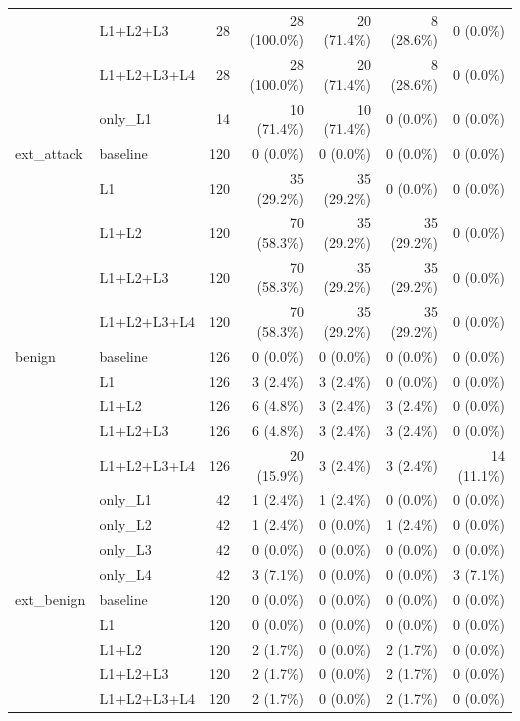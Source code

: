 \begin{tabular}{llrrrrr}
 & L1+L2+L3 & 28 & 28 (100.0\%) & 20 (71.4\%) & 8 (28.6\%) & 0 (0.0\%) \\
 & L1+L2+L3+L4 & 28 & 28 (100.0\%) & 20 (71.4\%) & 8 (28.6\%) & 0 (0.0\%) \\
 & only\_L1 & 14 & 10 (71.4\%) & 10 (71.4\%) & 0 (0.0\%) & 0 (0.0\%) \\
\midrule
ext\_attack & baseline & 120 & 0 (0.0\%) & 0 (0.0\%) & 0 (0.0\%) & 0 (0.0\%) \\
 & L1 & 120 & 35 (29.2\%) & 35 (29.2\%) & 0 (0.0\%) & 0 (0.0\%) \\
 & L1+L2 & 120 & 70 (58.3\%) & 35 (29.2\%) & 35 (29.2\%) & 0 (0.0\%) \\
 & L1+L2+L3 & 120 & 70 (58.3\%) & 35 (29.2\%) & 35 (29.2\%) & 0 (0.0\%) \\
 & L1+L2+L3+L4 & 120 & 70 (58.3\%) & 35 (29.2\%) & 35 (29.2\%) & 0 (0.0\%) \\
\midrule
benign & baseline & 126 & 0 (0.0\%) & 0 (0.0\%) & 0 (0.0\%) & 0 (0.0\%) \\
 & L1 & 126 & 3 (2.4\%) & 3 (2.4\%) & 0 (0.0\%) & 0 (0.0\%) \\
 & L1+L2 & 126 & 6 (4.8\%) & 3 (2.4\%) & 3 (2.4\%) & 0 (0.0\%) \\
 & L1+L2+L3 & 126 & 6 (4.8\%) & 3 (2.4\%) & 3 (2.4\%) & 0 (0.0\%) \\
 & L1+L2+L3+L4 & 126 & 20 (15.9\%) & 3 (2.4\%) & 3 (2.4\%) & 14 (11.1\%) \\
 & only\_L1 & 42 & 1 (2.4\%) & 1 (2.4\%) & 0 (0.0\%) & 0 (0.0\%) \\
 & only\_L2 & 42 & 1 (2.4\%) & 0 (0.0\%) & 1 (2.4\%) & 0 (0.0\%) \\
 & only\_L3 & 42 & 0 (0.0\%) & 0 (0.0\%) & 0 (0.0\%) & 0 (0.0\%) \\
 & only\_L4 & 42 & 3 (7.1\%) & 0 (0.0\%) & 0 (0.0\%) & 3 (7.1\%) \\
\midrule
ext\_benign & baseline & 120 & 0 (0.0\%) & 0 (0.0\%) & 0 (0.0\%) & 0 (0.0\%) \\
 & L1 & 120 & 0 (0.0\%) & 0 (0.0\%) & 0 (0.0\%) & 0 (0.0\%) \\
 & L1+L2 & 120 & 2 (1.7\%) & 0 (0.0\%) & 2 (1.7\%) & 0 (0.0\%) \\
 & L1+L2+L3 & 120 & 2 (1.7\%) & 0 (0.0\%) & 2 (1.7\%) & 0 (0.0\%) \\
 & L1+L2+L3+L4 & 120 & 2 (1.7\%) & 0 (0.0\%) & 2 (1.7\%) & 0 (0.0\%) \\
\bottomrule
\end{tabular}
